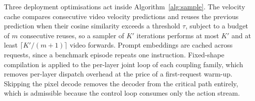 Three deployment optimisations act inside Algorithm~\ref{alg:sample}. The velocity cache
compares consecutive video velocity predictions and reuses the previous
prediction when their cosine similarity exceeds a threshold $\tau$, subject to a
budget of $m$ consecutive reuses, so a sampler of $K'$ iterations performs at
most $K'$ and at least $\lceil K' / (m+1) \rceil$ video forwards. Prompt
embeddings are cached across requests, since a benchmark episode repeats one
instruction. Fixed-shape compilation is applied to the per-layer joint loop of
each coupling family, which removes per-layer dispatch overhead at the price of a
first-request warm-up. Skipping the pixel decode removes the decoder from the
critical path entirely, which is admissible because the control loop consumes
only the action stream.

